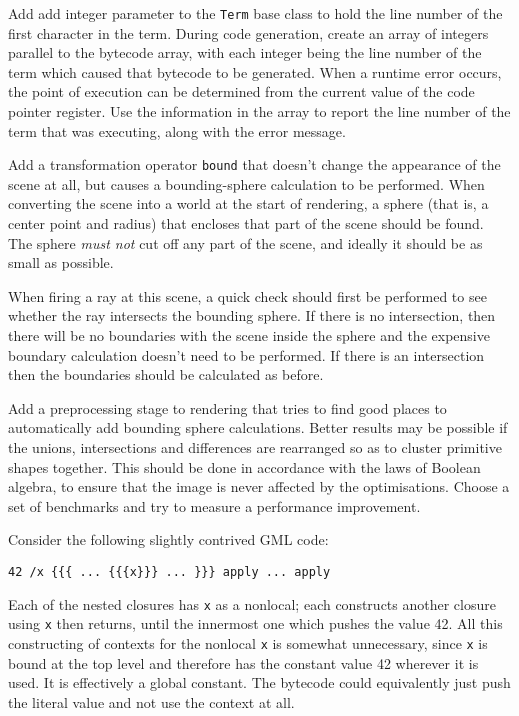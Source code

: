 \begin{samepage}
\ex
Add add integer parameter to the \verb!Term! base class to hold
the line number of the first character in the term.
During code generation,
create an array of integers parallel to the bytecode array,
with each integer being the line number of
the term which caused that bytecode to be generated.
When a runtime error occurs,
the point of execution can be determined
from the current value of the code pointer register.
Use the information in the array to report the line number
of the term that was executing,
along with the error message.
\end{samepage}

\begin{samepage}
\ex
Add a transformation operator \verb!bound! that
doesn't change the appearance of the scene at all,
but causes a bounding-sphere calculation to be performed.
When converting the scene into a world at the start of rendering,
a sphere (that is, a center point and radius)
that encloses that part of the scene should be found.
The sphere \emph{must not} cut off any part of the scene,
and ideally it should be as small as possible.
\end{samepage}

When firing a ray at this scene,
a quick check should first be performed
to see whether the ray intersects the bounding sphere.
If there is no intersection,
then there will be no boundaries with the scene inside the sphere
and the expensive boundary calculation doesn't need to be performed.
If there is an intersection then the boundaries should be calculated as before.

\begin{samepage}
\ex
Add a preprocessing stage to rendering
that tries to find good places
to automatically add bounding sphere calculations.
Better results may be possible if the
unions, intersections and differences are rearranged
so as to cluster primitive shapes together.
This should be done in accordance with the laws of Boolean algebra,
to ensure that the image is never affected by the optimisations.
Choose a set of benchmarks and try to measure a performance improvement.
\end{samepage}

\begin{samepage}
\ex
Consider the following slightly contrived GML code:
\begin{center}
\verb!42 /x {{{ ... {{{x}}} ... }}} apply ... apply!
\end{center}
Each of the nested closures has \verb!x! as a nonlocal;
each constructs another closure using \verb!x! then returns,
until the innermost one which pushes the value 42.
All this constructing of contexts for the nonlocal \verb!x!
is somewhat unnecessary,
since \verb!x! is bound at the top level
and therefore has the constant value 42 wherever it is used.
It is effectively a global constant.
The bytecode could equivalently just push the literal value
and not use the context at all.
\end{samepage}

